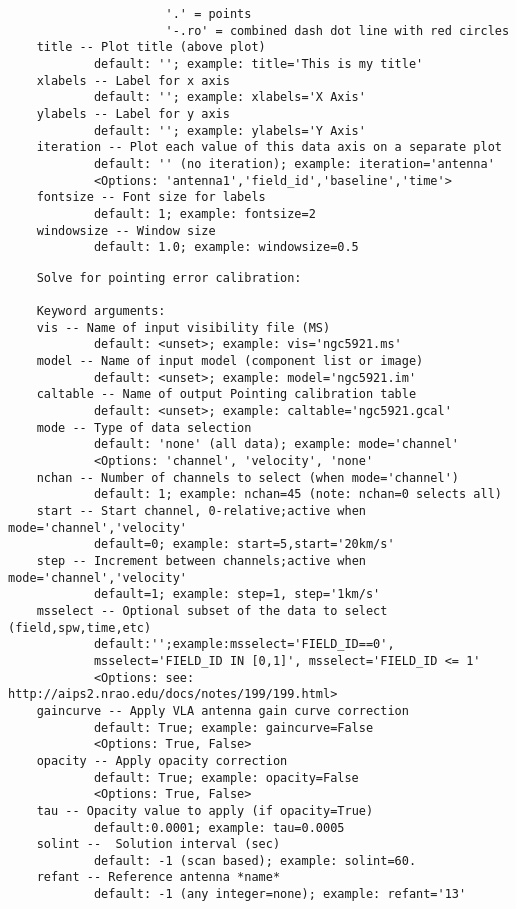 \begin{verbatim}
                      '.' = points
                      '-.ro' = combined dash dot line with red circles
    title -- Plot title (above plot)
            default: ''; example: title='This is my title'
    xlabels -- Label for x axis
            default: ''; example: xlabels='X Axis'
    ylabels -- Label for y axis
            default: ''; example: ylabels='Y Axis'
    iteration -- Plot each value of this data axis on a separate plot
            default: '' (no iteration); example: iteration='antenna'
            <Options: 'antenna1','field_id','baseline','time'>
    fontsize -- Font size for labels
            default: 1; example: fontsize=2
    windowsize -- Window size
            default: 1.0; example: windowsize=0.5
\end{verbatim}
\normalsize

\vspace{3mm}
\small
\begin{verbatim}
    Solve for pointing error calibration:
    
    Keyword arguments:
    vis -- Name of input visibility file (MS)
            default: <unset>; example: vis='ngc5921.ms'
    model -- Name of input model (component list or image)
            default: <unset>; example: model='ngc5921.im'
    caltable -- Name of output Pointing calibration table
            default: <unset>; example: caltable='ngc5921.gcal'
    mode -- Type of data selection
            default: 'none' (all data); example: mode='channel'
            <Options: 'channel', 'velocity', 'none'
    nchan -- Number of channels to select (when mode='channel')
            default: 1; example: nchan=45 (note: nchan=0 selects all)
    start -- Start channel, 0-relative;active when mode='channel','velocity'
            default=0; example: start=5,start='20km/s'
    step -- Increment between channels;active when mode='channel','velocity'
            default=1; example: step=1, step='1km/s'
    msselect -- Optional subset of the data to select (field,spw,time,etc)
            default:'';example:msselect='FIELD_ID==0', 
            msselect='FIELD_ID IN [0,1]', msselect='FIELD_ID <= 1'
            <Options: see: http://aips2.nrao.edu/docs/notes/199/199.html>
    gaincurve -- Apply VLA antenna gain curve correction
            default: True; example: gaincurve=False
            <Options: True, False>
    opacity -- Apply opacity correction
            default: True; example: opacity=False
            <Options: True, False>
    tau -- Opacity value to apply (if opacity=True)
            default:0.0001; example: tau=0.0005
    solint --  Solution interval (sec)
            default: -1 (scan based); example: solint=60.
    refant -- Reference antenna *name*
            default: -1 (any integer=none); example: refant='13'
\end{verbatim}
\normalsize

